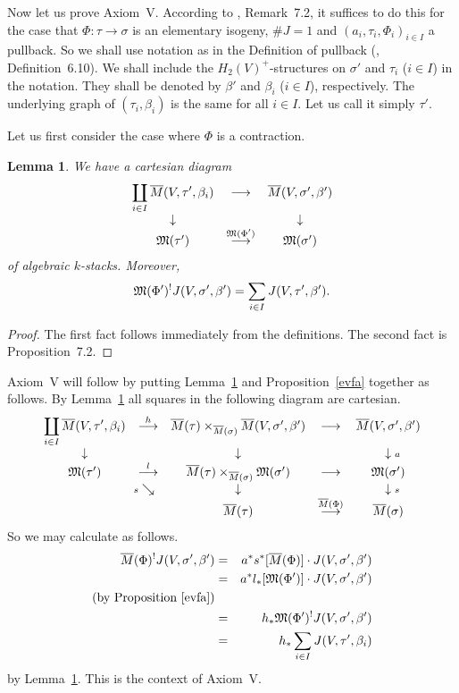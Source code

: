 \documentclass{article}
\newtheorem{lem}[prop]{Lemma}
\newcommand{\upst}{^{\ast}}
\newcommand{\upsh}{^{!}}
\newcommand{\lst}{_{\ast}}
\newcommand{\MM}{{\frak M}}
\newcommand{\ol}{\overline}
\newcommand{\ldiag}[1]%
       {\makebox[0cm]{${\scriptstyle#1}\downarrow\phantom{\scriptstyle#1}$}}
\newcommand{\rdiag}[1]%
       {\makebox[0cm]{$\phantom{\scriptstyle#1}\downarrow{\scriptstyle#1}$}}
\newcommand{\sediag}[1]%
       {\makebox[0cm]{${\scriptstyle#1}\searrow\phantom{\scriptstyle#1}$}}
\newcommand{\comdia}[9]{%
\begin{array}{ccc}
#1 & \stackrel{#2}{\longrightarrow} & #3 \\
\ldiag{#4} & #5 & \rdiag{#6} \\
#7 & \stackrel{#8}{\longrightarrow} & #9
\end{array}}
\begin{document}
Now let us prove Axiom~V.
According to \cite{BM}, Remark~7.2, it suffices to do this
for the case that $\Phi:\tau\to \sigma$ is an elementary isogeny,
$\#J=1$ and $(a_i,\tau_i,\Phi_i)_{i\in I}$ a pullback. So we shall use
notation as in the Definition of pullback (\cite{BM}, Definition~6.10).
We shall include the $H_2(V)^+$-structures on $\sigma'$ and $\tau_i$
($i\in I$) in the notation. They shall be denoted by $\beta'$ and
$\beta_i$ ($i\in I$), respectively.
The underlying graph of $(\tau_i,\beta_i)$ is the same for all $i\in
I$. Let us call it simply $\tau'$.

Let us first consider the case where $\Phi$ is a contraction.

\begin{lem} \label{tdic}
We have a cartesian diagram
\[\comdia{\displaystyle\coprod_{i\in I}\ol{M}(V,\tau',\beta_i)}
{}{\ol{M}(V,\sigma',\beta')} {}{}{}
{\MM(\tau')}{\MM(\Phi')}{\MM(\sigma')}\]
of algebraic $k$-stacks. Moreover,
\[\MM(\Phi')\upsh J(V,\sigma',\beta')=\sum_{i\in
I}J(V,\tau',\beta').\]
\end{lem}
\begin{proof}
The first fact follows immediately from the definitions. The second
fact is \cite{BF} Proposition~7.2.
\end{proof}

Axiom~V will follow by putting Lemma~\ref{tdic} and
Proposition~\ref{evfa} together as follows.
By Lemma~\ref{tdic} all squares in the following diagram are cartesian.
\[\begin{array}{ccccc}
{\displaystyle\coprod_{i\in I}\ol{M}(V,\tau',\beta_i)}&
\stackrel{h}{\longrightarrow} &
\ol{M}(\tau)\times_{\ol{M}(\sigma)}\ol{M}(V,\sigma',\beta') &
\longrightarrow &
\ol{M}(V,\sigma',\beta') \\
\ldiag{} & & \ldiag{} & & \rdiag{a} \\
\MM(\tau') & \stackrel{l}{\longrightarrow} &
\ol{M}(\tau)\times_{\ol{M}(\sigma)}\MM(\sigma') &
\longrightarrow & \MM(\sigma')\\
& \sediag{s} & \ldiag{} & & \rdiag{s} \\
&&\ol{M}(\tau)& \stackrel{\ol{M}(\Phi)}{\longrightarrow} &
\ol{M}(\sigma) \end{array}\]
So we may calculate as follows.
\begin{eqnarray*}
\ol{M}(\Phi)\upsh J(V,\sigma',\beta')  & = &
a\upst s\upst[\ol{M}(\Phi)]\cdot J(V,\sigma',\beta')\\
&=& a\upst l\lst[\MM(\Phi')]\cdot J(V,\sigma',\beta')\\
 \mbox{(by Proposition~\ref{evfa})}& & \\
&=& h\lst\MM(\Phi')\upsh J(V,\sigma',\beta')\\
&=& h\lst\sum_{i\in I} J(V,\tau',\beta_i)
\end{eqnarray*}
by Lemma~\ref{tdic}. This is the context of Axiom~V.
\end{document}
